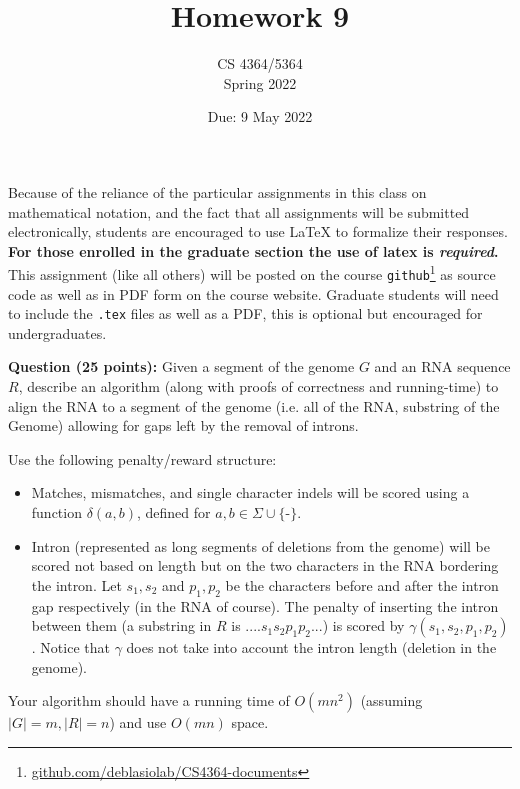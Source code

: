 \documentclass[11pt, oneside]{article}   	%
\title{Homework 9}
\author{CS 4364/5364\\Spring 2022}
\date{Due: 9 May 2022}							%
\begin{document}
\maketitle

Because of the reliance of the particular assignments in this class on mathematical notation, 
and the fact that all assignments will be submitted electronically, 
students are encouraged to use \LaTeX{} to formalize their responses. 
\textbf{For those enrolled in the graduate section the use of latex is \emph{required}.}
This assignment (like all others) will be posted on the course \texttt{github}\footnote{\url{github.com/deblasiolab/CS4364-documents}} as source code as well as in PDF form on the course website. 
Graduate students will need to include the \texttt{.tex} files as well as a PDF, this is optional but encouraged for undergraduates. 

\textbf{Question (25 points):} 
Given a segment of the genome $G$ and an RNA sequence $R$, 
describe an algorithm (along with proofs of correctness and running-time) 
to align the RNA to a segment of the genome (i.e. all of the RNA, substring of the Genome) 
allowing for gaps left by the removal of introns. 

Use the following penalty/reward structure: 
\begin{itemize}
\item Matches, mismatches, and single character indels will be scored using a function $\delta(a,b)$, defined for $a,b \in \Sigma \cup \{\texttt{-}\}$.
\item Intron (represented as long segments of deletions from the genome) will be scored not based on length but on the two characters in the RNA bordering the intron. 
Let $s_1,s_2$ and $p_1,p_2$ be the characters before and after the intron gap respectively (in the RNA of course). 
The penalty of inserting the intron between them (a substring in $R$ is $....s_1s_2p_1p_2...$) is scored by $\gamma(s_1,s_2,p_1,p_2)$.
Notice that $\gamma$ does not take into account the intron length (deletion in the genome). 
\end{itemize}

Your algorithm should have a running time of $O(mn^2)$ (assuming $|G|=m,|R|=n$) and use $O(mn)$ space.
\end{document}
